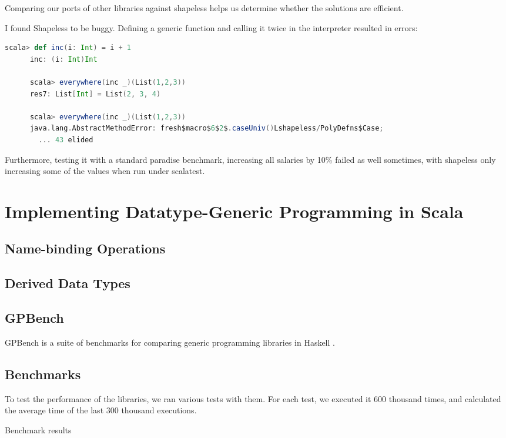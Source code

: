 \documentclass[abstracton,parskip=half]{scrreprt}
\begin{document}
    Comparing our ports of other libraries against shapeless helps us determine
    whether the solutions are efficient.

    I found Shapeless to be buggy. Defining a generic function and calling
    it twice in the interpreter resulted in errors:
    \begin{lstlisting}[language=Scala,gobble=6]
      scala> def inc(i: Int) = i + 1
      inc: (i: Int)Int

      scala> everywhere(inc _)(List(1,2,3))
      res7: List[Int] = List(2, 3, 4)

      scala> everywhere(inc _)(List(1,2,3))
      java.lang.AbstractMethodError: fresh$macro$6$2$.caseUniv()Lshapeless/PolyDefns$Case;
        ... 43 elided
    \end{lstlisting}

    Furthermore, testing it with a standard paradise benchmark, increasing all
    salaries by 10\% failed as well sometimes, with shapeless only increasing
    some of the values when run under scalatest.

    \chapter{Implementing Datatype-Generic Programming in Scala}
    \section{Name-binding Operations}
    \section{Derived Data Types}
    \section{GPBench}
    GPBench is a suite of benchmarks for comparing generic programming
    libraries in Haskell \cite{DBLP:conf/haskell/RodriguezJJGKO08}.

    \section{Benchmarks}

    To test the performance of the libraries, we ran various tests with them. For
    each test, we executed it 600 thousand times, and calculated the average
    time of the last 300 thousand executions.

    \begin{table}[ht]
    
    \caption{Benchmark results}
    \label{bench}
    \end{table}
\end{document}

